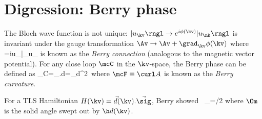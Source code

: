 \section{Digression: Berry phase}
The Bloch wave function is not unique: $|u_\kv\rngl\to e^{i\phi(\kv)}|u_\nk\rngl$ is invariant under the gauge transformation $\Av \to \Av +\grad_\kv \phi(\kv)$ where
\blgn
\Av=i\lngl u_\kv|\grad_\kv u_\kv\rngl
\elgn
is known as the \emph{Berry connection} (analogous to the magnetic vector potential). 
For any close loop $\mcC$ in the $\kv$-space, the Berry phase can be defined as
\blgn
\gamma_C=\oint_\mcC \Av.d\kv =\int_\mcS \mcF d^2\kv\,
\elgn 
where $\mcF\equiv \curl A$ is known as the \emph{Berry curvature}.

For a TLS Hamiltonian $H(\kv)=\vec{d}(\kv).\vec{\sig}$, Berry showed~\cite{berry:prs84}\tbs
\blgn
\g_\mcC=\Om/2
\elgn
where $\Om$ is the solid angle swept out by $\h d(\kv)$.

\def\Qe{Q_\text{end}}
